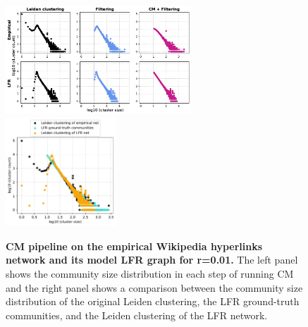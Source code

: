 \documentclass[11pt]{article}   	%
\begin{document}
\begin{figure}[h!]
\centering
\includegraphics[width=0.62\textwidth]{figs/wiki_topcats_cm_steps_lfr01.pdf}
\includegraphics[width=0.37\textwidth]{figs/wiki_topcats_01_cm_size.pdf}
\caption[CM pipeline on the  empirical Wikipedia hyperlinks network and its model LFR graph for r=0.01]{\textbf{CM pipeline on the empirical Wikipedia hyperlinks network and its model LFR graph for r=0.01.} The left panel shows the community size distribution in each step of running CM and the right panel shows a comparison between the community size distribution of the original Leiden clustering, the LFR ground-truth communities, and the Leiden clustering of the LFR network.}
\label{fig:wikitopcats-cm-lfr-01}
\end{figure}
\end{document}
